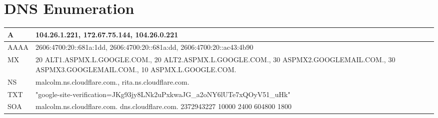 
\section{DNS Enumeration}
\begin{tabularx}{\textwidth}{|l|X|}
\hline
A & 104.26.1.221, 172.67.75.144, 104.26.0.221 \\ \hline
AAAA & 2606:4700:20::681a:1dd, 2606:4700:20::681a:dd, 2606:4700:20::ac43:4b90 \\ \hline
MX & 20 ALT1.ASPMX.L.GOOGLE.COM., 20 ALT2.ASPMX.L.GOOGLE.COM., 30 ASPMX2.GOOGLEMAIL.COM., 30 ASPMX3.GOOGLEMAIL.COM., 10 ASPMX.L.GOOGLE.COM. \\ \hline
NS & malcolm.ns.cloudflare.com., rita.ns.cloudflare.com. \\ \hline
TXT & "google-site-verification=JKg93jy8LNk2uPxkwaJG_a2oNY6lUTe7xQOyV51_uHk" \\ \hline
SOA & malcolm.ns.cloudflare.com. dns.cloudflare.com. 2372943227 10000 2400 604800 1800 \\ \hline
\end{tabularx}
